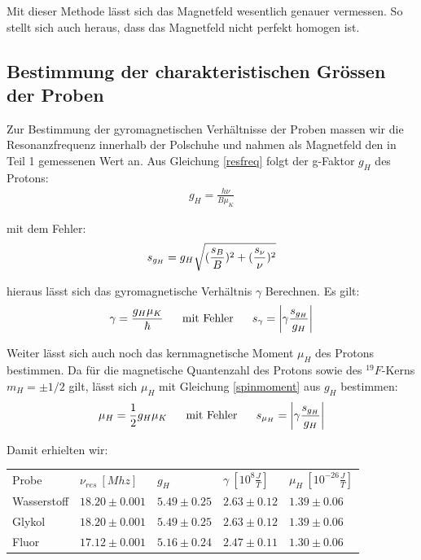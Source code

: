 \documentclass[12pt]{article}
\begin{document}
Mit dieser Methode lässt sich das Magnetfeld wesentlich genauer vermessen. So stellt sich auch heraus, dass das Magnetfeld nicht perfekt homogen ist.

\subsection{Bestimmung der charakteristischen Grössen der Proben}

Zur Bestimmung der gyromagnetischen Verhältnisse der Proben massen wir die Resonanzfrequenz innerhalb der Polschuhe und nahmen als Magnetfeld den in Teil 1 gemessenen Wert an. Aus Gleichung \ref{resfreq} folgt der g-Faktor $g_H$ des Protons:
\begin{align}
 g_H = \frac{h\nu}{B \mu_K}
\end{align}

mit dem Fehler:
\begin{align}
 \notag s_{g_H} = g_H \sqrt{(\frac{s_B}{B})^2+(\frac{s_{\nu}}{\nu})^2}
\end{align}

hieraus lässt sich das gyromagnetische Verhältnis $\gamma$ Berechnen. Es gilt:
\begin{align}
 \gamma = \frac{g_H \mu_K}{\hbar}~~~~~\textnormal{mit Fehler}~~~~~s_{\gamma} = \left| \gamma \frac{s_{g_H}}{g_H} \right|
\end{align}

Weiter lässt sich auch noch das kernmagnetische Moment $\mu_H$ des Protons bestimmen. Da für die magnetische Quantenzahl des Protons sowie des $^{19}F$-Kerns $m_H = \pm1/2$ gilt, lässt sich $\mu_H$ mit Gleichung \ref{spinmoment} aus $g_H$ bestimmen:
\begin{align}
 \mu_H = \frac{1}{2} g_H \mu_K~~~~~\textnormal{mit Fehler}~~~~~s_{\mu_H}= \left| \gamma \frac{s_{g_H}}{g_H} \right|
\end{align}

Damit erhielten wir:
\begin{center}
\begin{tabular}{l|llll}
Probe & $\nu_{res}~[Mhz]$ & $g_H$ & $\gamma~[10^8\frac{J}{T}]$ & $\mu_H~[10^{-26}\frac{J}{T}]$ \\ 
Wasserstoff & $18.20\pm0.001$ & $5.49\pm0.25$ & $2.63\pm0.12$ & $1.39\pm0.06$ \\ 
Glykol & $18.20\pm0.001$ & $5.49\pm0.25$ & $2.63\pm0.12$ & $1.39\pm0.06$ \\ 
Fluor & $17.12\pm0.001$ & $5.16\pm0.24$ & $2.47\pm0.11$ & $1.30\pm0.06$


\end{tabular}
\end{center}
\end{document}
